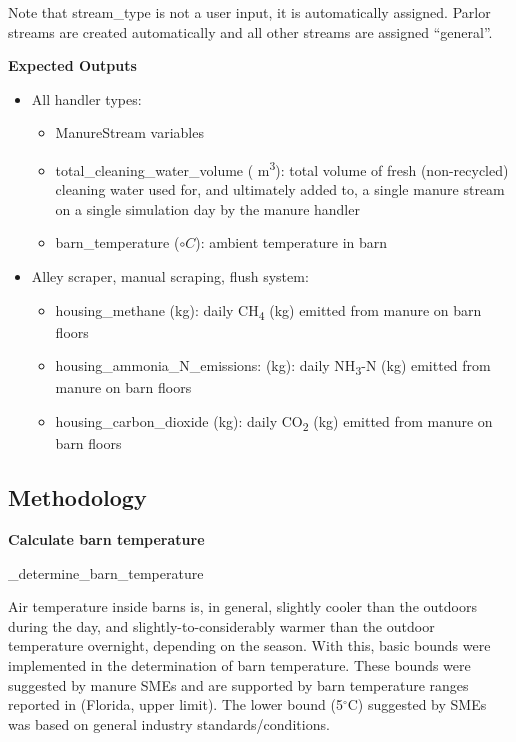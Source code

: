 \begin{refsection}
\begin{itemize}
\end{itemize}
\begin{tcolorbox}[colback=white, colframe=black, boxrule=0.5pt, arc=3pt, width=\textwidth]
Note that stream\_type is not a user input, it is automatically assigned. Parlor streams are created automatically and all other streams are assigned “general”.
\end{tcolorbox}


\textbf{Expected Outputs}
\vspace{ 0.25cm}
\begin{itemize}
    \item All handler types:
    \begin{itemize}
        \item ManureStream variables
        \item total\_cleaning\_water\_volume ( m\textsuperscript{3}): total volume of fresh (non-recycled) cleaning water used for, and ultimately added to, a single manure stream on a single simulation day by the manure handler
        \item barn\_temperature (\(\circ C\)): ambient temperature in barn
    \end{itemize}
    \item Alley scraper, manual scraping, flush system:
    \begin{itemize}
        \item housing\_methane (kg): daily CH\textsubscript{4} (kg) emitted from manure on barn floors
        \item housing\_ammonia\_N\_emissions: (kg): daily NH\textsubscript{3}-N (kg) emitted from manure on barn floors
        \item housing\_carbon\_dioxide (kg): daily CO\textsubscript{2} (kg) emitted from manure on barn floors
    \end{itemize}

\end{itemize}


\subsection{Methodology}


\textbf{Calculate barn temperature}
\vspace{ 0.25cm}

\_determine\_barn\_temperature

Air temperature inside barns is, in general, slightly cooler than the outdoors during the day, and slightly-to-considerably warmer than the outdoor temperature overnight, depending on the season. With this, basic bounds were implemented in the determination of barn temperature. These bounds were suggested by manure SMEs and are supported by barn temperature ranges reported in \cite{Bucklin2009} (Florida, upper limit). The lower bound (5$^\circ$C) suggested by SMEs was based on general industry standards/conditions.


\end{refsection}
